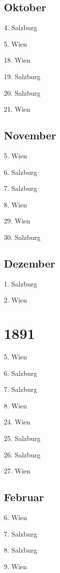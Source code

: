 \documentclass[twoside=false,titlepage=false,open=any, parskip=never, fontsize=10pt, headings=small, chapterprefix=false, appendixprefix=false, DIV=15]{scrbook}
\begin{document}
\begin{multicols}{3}
            \section*{Oktober}
            4. Salzburg\par
            5. Wien\par
            18. Wien\par
            19. Salzburg\par
            20. Salzburg\par
            21. Wien\par
            \section*{November}
            5. Wien\par
            6. Salzburg\par
            7. Salzburg\par
            8. Wien\par
            29. Wien\par
            30. Salzburg\par
            \section*{Dezember}
            1. Salzburg\par
            2. Wien\par
            \chapter*{1891}
            5. Wien\par
            6. Salzburg\par
            7. Salzburg\par
            8. Wien\par
            24. Wien\par
            25. Salzburg\par
            26. Salzburg\par
            27. Wien\par
            \section*{Februar}
            6. Wien\par
            7. Salzburg\par
            8. Salzburg\par
            9. Wien\par

\end{multicols}
\end{document}
